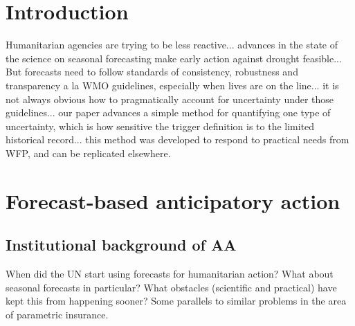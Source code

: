 \documentclass{ametsocV5}
\begin{document}




\section{Introduction}


Humanitarian agencies are trying to be less reactive... advances in the state of the science on seasonal forecasting make early action against drought feasible... But forecasts need to follow standards of consistency, robustness and transparency a la WMO guidelines, especially when lives are on the line... it is not always obvious how to pragmatically account for uncertainty under those guidelines... our paper advances a simple method for quantifying one type of uncertainty, which is how sensitive the trigger definition is to the limited historical record... this method was developed to respond to practical needs from WFP, and can be replicated elsewhere. 

\section{Forecast-based anticipatory action}

\subsection{Institutional background of AA}


When did the UN start using forecasts for humanitarian action? What about seasonal forecasts in particular? What obstacles (scientific and practical) have kept this from happening sooner? Some parallels to similar problems in the area of parametric insurance. 
\end{document}
